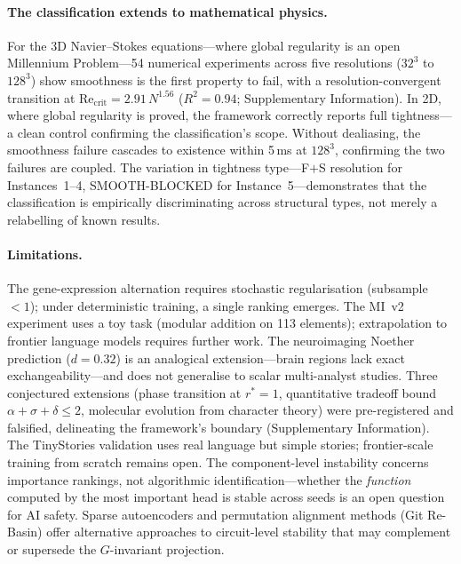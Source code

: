 \documentclass[11pt]{article}
\begin{document}
\paragraph{The classification extends to mathematical physics.}
For the 3D Navier--Stokes equations---where global regularity is an open
Millennium Problem---54 numerical experiments across five resolutions
($32^3$ to $128^3$) show smoothness is the first property to fail, with
a resolution-convergent transition at $\mathrm{Re}_{\mathrm{crit}} =
2.91\,N^{1.56}$ ($R^2 = 0.94$; Supplementary Information).  In 2D,
where global regularity is proved, the framework correctly reports full
tightness---a clean control confirming the classification's scope.
Without dealiasing, the smoothness failure cascades to existence within
5\,ms at $128^3$, confirming the two failures are coupled.  The
variation in tightness type---F$+$S resolution for Instances~1--4,
SMOOTH-BLOCKED for Instance~5---demonstrates that the classification
is empirically discriminating across structural types, not merely
a relabelling of known results.

\paragraph{Limitations.}
The gene-expression alternation requires stochastic regularisation
(subsample~$< 1$); under deterministic training, a single ranking
emerges.  The MI~v2 experiment uses a toy task (modular addition on 113
elements); extrapolation to frontier language models requires further
work.  The neuroimaging Noether prediction ($d = 0.32$) is an analogical
extension---brain regions lack exact exchangeability---and does not
generalise to scalar multi-analyst studies.  Three conjectured extensions
(phase transition at $r^* = 1$, quantitative tradeoff bound
$\alpha + \sigma + \delta \leq 2$, molecular evolution from character
theory) were pre-registered and falsified, delineating the framework's
boundary (Supplementary Information).  The TinyStories validation uses
real language but simple stories; frontier-scale training from scratch
remains open.  The component-level instability concerns importance
rankings, not algorithmic identification---whether the \emph{function}
computed by the most important head is stable across seeds is an open
question for AI safety.  Sparse autoencoders and permutation alignment
methods (Git Re-Basin) offer alternative approaches to circuit-level
stability that may complement or supersede the $G$-invariant projection.
\end{document}
